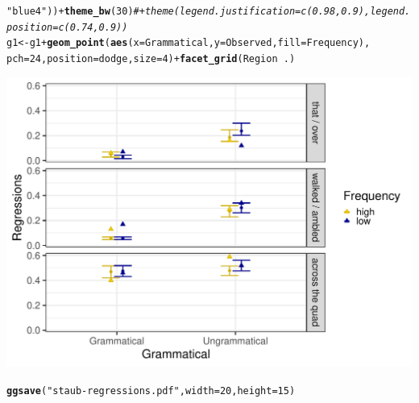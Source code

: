\documentclass{article}\usepackage[]{graphicx}\usepackage[]{color}
\makeatletter
\def\maxwidth{ %
  \ifdim\Gin@nat@width>\linewidth
    \linewidth
  \else
    \Gin@nat@width
  \fi
}
\newcommand{\hlnum}[1]{\textcolor[rgb]{0.686,0.059,0.569}{#1}}%
\newcommand{\hlstr}[1]{\textcolor[rgb]{0.192,0.494,0.8}{#1}}%
\newcommand{\hlcom}[1]{\textcolor[rgb]{0.678,0.584,0.686}{\textit{#1}}}%
\newcommand{\hlopt}[1]{\textcolor[rgb]{0,0,0}{#1}}%
\newcommand{\hlstd}[1]{\textcolor[rgb]{0.345,0.345,0.345}{#1}}%
\newcommand{\hlkwb}[1]{\textcolor[rgb]{0.69,0.353,0.396}{#1}}%
\newcommand{\hlkwc}[1]{\textcolor[rgb]{0.333,0.667,0.333}{#1}}%
\newcommand{\hlkwd}[1]{\textcolor[rgb]{0.737,0.353,0.396}{\textbf{#1}}}%
\newenvironment{kframe}{%
 \def\at@end@of@kframe{}%
 \ifinner\ifhmode%
  \def\at@end@of@kframe{\end{minipage}}%
  \begin{minipage}{\columnwidth}%
 \fi\fi%
 \def\FrameCommand##1{\hskip\@totalleftmargin \hskip-\fboxsep
 \colorbox{shadecolor}{##1}\hskip-\fboxsep
     \hskip-\linewidth \hskip-\@totalleftmargin \hskip\columnwidth}%
 \MakeFramed {\advance\hsize-\width
   \@totalleftmargin\z@ \linewidth\hsize
   \@setminipage}}%
 {\par\unskip\endMakeFramed%
 \at@end@of@kframe}
\newenvironment{knitrout}{}{} %
\makeatother
\begin{document}
\begin{knitrout}
\begin{kframe}
\begin{alltt}
    \hlstr{"blue4"}\hlstd{))} \hlopt{+} \hlkwd{theme_bw}\hlstd{(}\hlnum{30}\hlstd{)}  \hlcom{# + theme(legend.justification = c(0.98, 0.9), legend.position = c(0.74, 0.9)) }
\hlstd{g1} \hlkwb{<-} \hlstd{g1} \hlopt{+} \hlkwd{geom_point}\hlstd{(}\hlkwd{aes}\hlstd{(}\hlkwc{x} \hlstd{= Grammatical,} \hlkwc{y} \hlstd{= Observed,} \hlkwc{fill} \hlstd{= Frequency),}
    \hlkwc{pch} \hlstd{=} \hlnum{24}\hlstd{,} \hlkwc{position} \hlstd{= dodge,} \hlkwc{size} \hlstd{=} \hlnum{4}\hlstd{)} \hlopt{+} \hlkwd{facet_grid}\hlstd{(Region} \hlopt{~} \hlstd{.)}
\end{alltt}
\end{kframe}
\end{knitrout}

\begin{knitrout}
\color{fgcolor}
\includegraphics[width=\maxwidth]{figures/figure_staub_exp3unnamed-chunk-11-1} 

\end{knitrout}


\begin{knitrout}
\color{fgcolor}\begin{kframe}
\begin{alltt}
\hlkwd{ggsave}\hlstd{(}\hlstr{"staub-regressions.pdf"}\hlstd{,} \hlkwc{width} \hlstd{=} \hlnum{20}\hlstd{,} \hlkwc{height} \hlstd{=} \hlnum{15}\hlstd{)}
\end{alltt}
\end{kframe}
\end{knitrout}
\end{document}
